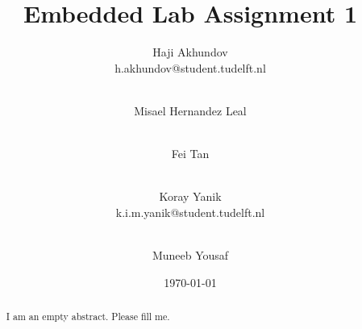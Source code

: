 \documentclass[a4paper,10pt]{article}
\title{Embedded Lab Assignment 1}
\author{
Haji Akhundov\\h.akhundov@student.tudelft.nl \and \\
Misael Hernandez Leal \and \\
Fei Tan \and \\
Koray Yanik\\k.i.m.yanik@student.tudelft.nl \and \\
Muneeb Yousaf
}
\date{\today}
\begin{document}
\maketitle

\begin{abstract}
I am an empty abstract. Please fill me.
\end{abstract}










\end{document}
